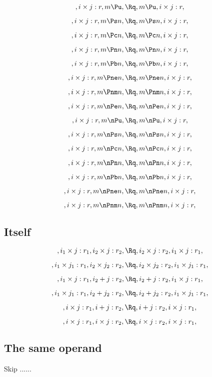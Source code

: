 \[, i \times j:r, m \Pu, \Rq , m \Pu, i \times j:r,\]

\[, i \times j:r, m \Ps n, \Rq , m \Ps n, i \times j:r,\]

\[, i \times j:r, m \Pc n, \Rq , m \Pc n, i \times j:r,\]

\[, i \times j:r, m \Pn n, \Rq , m \Pn n, i \times j:r,\]

\[, i \times j:r, m \Pb n, \Rq , m \Pb n, i \times j:r,\]

\[, i \times j:r, m \Pne n, \Rq , m \Pne n, i \times j:r,\]

\[, i \times j:r, m \Pnm n, \Rq , m \Pnm n, i \times j:r,\]


\[, i \times j:r, m \nPe n, \Rq , m \nPe n, i \times j:r,\]

\[, i \times j:r, m \nPu, \Rq , m \nPu, i \times j:r,\]

\[, i \times j:r, m \nPs n, \Rq , m \nPs n, i \times j:r,\]

\[, i \times j:r, m \nPc n, \Rq , m \nPc n, i \times j:r,\]

\[, i \times j:r, m \nPn n, \Rq , m \nPn n, i \times j:r,\]

\[, i \times j:r, m \nPb n, \Rq , m \nPb n, i \times j:r,\]

\[, i \times j:r, m \nPne n, \Rq , m \nPne n, i \times j:r,\]

\[, i \times j:r, m \nPnm n, \Rq , m \nPnm n, i \times j:r,\]



\bigskip
\bigskip
\subsection{Itself}
\[, i_1 \times j:r_1, i_2 \times j:r_2, \Rq , i_2 \times j:r_2, i_1 \times j:r_1,\]

\[, i_1 \times j_1:r_1, i_2 \times j_2:r_2, \Rq , i_2 \times j_2:r_2, i_1 \times j_1:r_1,\]


\[, i_1 \times j:r_1, i_2 + j:r_2, \Rq , i_2 + j:r_2, i_1 \times j:r_1,\]

\[, i_1 \times j_1:r_1, i_2 + j_2:r_2, \Rq , i_2 + j_2:r_2, i_1 \times j_1:r_1,\]

\[, i \times j:r_1, i + j:r_2, \Rq , i + j:r_2, i \times j:r_1,\]

\[, i \times j:r_1, i \times j:r_2, \Rq , i \times j:r_2, i \times j:r_1,\]


\bigskip
\bigskip
\subsection{The same operand}
Skip ......


